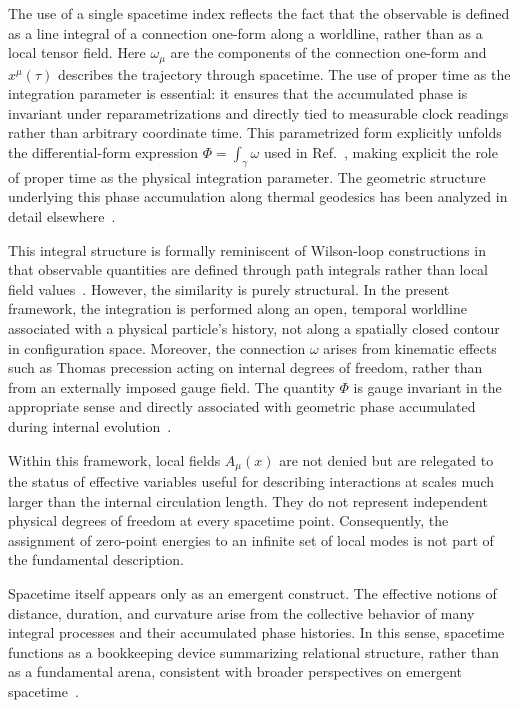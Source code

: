 \documentclass[%
 reprint,
 amsmath,amssymb,
 aps,
 prb,
]{revtex4-2}
\numberwithin{equation}{section}
\begin{document}

The use of a single spacetime index reflects the fact that the observable is defined as a line integral of a connection one-form along a worldline, rather than as a local tensor field. Here $\omega_\mu$ are the components of the connection one-form and $x^\mu(\tau)$ describes the trajectory through spacetime. The use of proper time as the integration parameter is essential: it ensures that the accumulated phase is invariant under reparametrizations and directly tied to measurable clock readings rather than arbitrary coordinate time. This parametrized form explicitly unfolds the differential-form expression $\Phi = \int_\gamma \omega$ used in Ref.~\cite{hanamura18135855}, making explicit the role of proper time as the physical integration parameter. The geometric structure underlying this phase accumulation along thermal geodesics has been analyzed in detail elsewhere~\cite{hanamura18067760,hanamura18135855}.

This integral structure is formally reminiscent of Wilson-loop constructions in that observable quantities are defined through path integrals rather than local field values~\cite{Wilson1974}. However, the similarity is purely structural. In the present framework, the integration is performed along an open, temporal worldline associated with a physical particle's history, not along a spatially closed contour in configuration space. Moreover, the connection $\omega$ arises from kinematic effects such as Thomas precession acting on internal degrees of freedom, rather than from an externally imposed gauge field. The quantity $\Phi$ is gauge invariant in the appropriate sense and directly associated with geometric phase accumulated during internal evolution~\cite{WuYang1975,Berry1984}.

Within this framework, local fields $A_\mu(x)$ are not denied but are relegated to the status of effective variables useful for describing interactions at scales much larger than the internal circulation length. They do not represent independent physical degrees of freedom at every spacetime point. Consequently, the assignment of zero-point energies to an infinite set of local modes is not part of the fundamental description.

Spacetime itself appears only as an emergent construct. The effective notions of distance, duration, and curvature arise from the collective behavior of many integral processes and their accumulated phase histories. In this sense, spacetime functions as a bookkeeping device summarizing relational structure, rather than as a fundamental arena, consistent with broader perspectives on emergent spacetime~\cite{Jacobson1995,Rovelli1997,Padmanabhan2010}.
\end{document}
